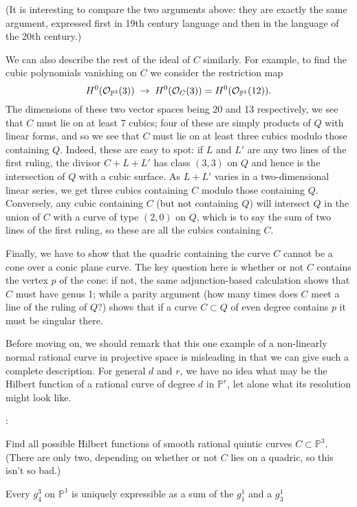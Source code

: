 \documentclass[12pt, leqno]{article}
\def\PP{{\mathbb P}}
\def\cO{{\cal O}}
\begin{document}
(It is interesting to compare the two arguments above: they are exactly the same argument, expressed first in 19th century language and then in the language of the 20th century.)

We can also describe the rest of the ideal of $C$ similarly. For example, to find the cubic polynomials vanishing on $C$ we consider the restriction map
$$
H^0(\cO_{\PP^3}(3)) \; \to \; H^0(\cO_{C}(3)) = H^0(\cO_{\PP^1}(12)).
$$
The dimensions of these two vector spaces being 20 and 13 respectively, we see that $C$ must lie on at least 7 cubics; four of these are simply products of $Q$ with linear forms, and so we see that $C$ must lie on at least three cubics modulo those containing $Q$. Indeed, these are easy to spot: if $L$ and $L'$ are any two lines of the first ruling, the divisor $C + L + L'$ has class $(3,3)$ on $Q$ and hence is the intersection of $Q$ with a cubic surface. As $L+L'$ varies in a two-dimensional linear series, we get three cubics containing $C$ modulo those containing $Q$. Conversely, any cubic containing $C$ (but not containing $Q$) will intersect $Q$ in the union of $C$ with a curve of type $(2,0)$ on $Q$, which is to say the sum of two lines of the first ruling, so these are all the cubics containing $C$.

Finally, we have to show that the quadric containing the curve $C$ cannot be a cone over a conic plane curve. The key question here is whether or not $C$ contains the vertex $p$ of the cone: if not, the same adjunction-based calculation shows that $C$ must have genus 1; while a parity argument (how many times does $C$ meet a line of the ruling of $Q$?) shows that if a curve $C \subset Q$ of even degree contains $p$ it must be singular there.

Before moving on, we should remark that this one example of a non-linearly normal rational curve in projective space is misleading in that we can give such a complete description. For general $d$ and $r$, we have no idea what may be the Hilbert function of a rational curve of degree $d$ in $\PP^r$, let alone what its resolution might look like.

:

Find all possible Hilbert functions of smooth rational quintic  curves $C \subset \PP^3$. (There are only two, depending on whether or not $C$ lies on a quadric, so this isn't so bad.)

Every $g^3_4$ on $\PP^1$ is uniquely expressible as a sum of the $g_1^1$ and a $g^1_3$
\end{document}
